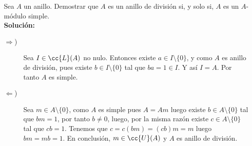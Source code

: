 \begin{ejercicio}
    Sea $A$ un anillo. Demostrar que $A$ es un anillo de división si, y solo  si, $A$ es un $A$-módulo simple. \\
    
    \noindent
    \textbf{Solución:}
    \begin{description}
        \item [$\Longrightarrow$)] Sea $I \in \cc{L}(A)$ no nulo. Entonces existe $a \in I \setminus \{0\}$, y como $A$ es anillo de división, pues existe $b \in I \setminus \{0\}$ tal que $ba = 1 \in I$. Y así $I = A$. Por tanto $A$ es simple. 
        \item [$\Longleftarrow$)] Sea $m \in A\setminus \{0\}$, como $A$ es simple pues $A = Am$ luego existe $b \in A\setminus \{0\}$ tal que $bm = 1$, por tanto $b\neq 0$, luego, por la misma razón existe $c \in A \setminus\{0\}$ tal que $cb = 1$. Tenemos que $c = c(bm) = (cb)m = m$ luego $bm = mb = 1$. En conclusión, $m \in \cc{U}(A)$ y $A$ es anillo de división. 
    \end{description}
\end{ejercicio}
